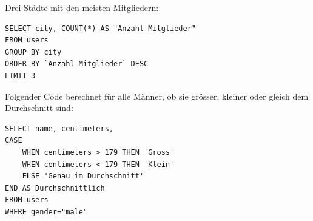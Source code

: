 \begin{landscape}
\begin{multicols*}{4}
\begin{tcolorboxTemplate}[title=Erste / Letzte Zeilen: \texorpdfstring{\lstinline[style=sql]|LIMIT|}{LIMIT},colbacktitle=white, coltitle=black]
Drei Städte mit den meisten Mitgliedern:
    \begin{lstlisting}[style=sql]
SELECT city, COUNT(*) AS "Anzahl Mitglieder"
FROM users
GROUP BY city
ORDER BY `Anzahl Mitglieder` DESC
LIMIT 3
\end{lstlisting}
\end{tcolorboxTemplate}

\begin{tcolorboxTemplate}[title=Verzweigungen: \texorpdfstring{\lstinline[style=sql]|CASE WHEN|}{CASE WHEN},colbacktitle=white, coltitle=black]
Folgender Code berechnet für alle Männer, ob sie grösser, kleiner oder gleich dem Durchschnitt sind:

\begin{lstlisting}[style=sql]
SELECT name, centimeters,
CASE 
	WHEN centimeters > 179 THEN 'Gross'
    WHEN centimeters < 179 THEN 'Klein'
    ELSE 'Genau im Durchschnitt'
END AS Durchschnittlich
FROM users
WHERE gender="male"
\end{lstlisting}
\end{tcolorboxTemplate}

\begin{tcolorboxTemplate}[title=Mehrere Tabellen verbinden: \texorpdfstring{\lstinline[style=sql]|JOIN|}{JOIN},colbacktitle=white, coltitle=black]
\begin{figure}[H]
  \centering


\end{figure}
\end{tcolorboxTemplate}
\end{multicols*}
\end{landscape}
